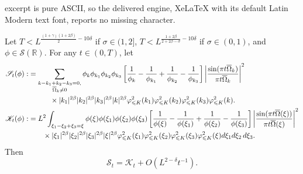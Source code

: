 \documentclass[10pt,a4paper]{amsart}
\def\dif{{\mathord{{\rm d}}}}
\def\leq{\leqslant}
\begin{document}
excerpt is pure ASCII, so the delivered engine, XeLaTeX with its default Latin Modern text font, reports no missing character.
\begin{proposition}
    \label{asymptotic}
Let $T  < L^{\frac{(1+\gamma)(1+2\beta)}{2}-10\delta}$ if $\sigma\in(1,2]$, $T  <L^{\frac{1+2\beta}{2+2\beta-\sigma}-10\delta} $ if $\sigma\in(0,1)$, and $\phi \in \mathcal{S}(\mathbb{R})$. 
For any $t \in (0,T)$, let   \begin{align*}
 \mathscr S_t(\phi):&=\sum\limits_{\substack{ k-k_1+k_2-k_3=0,\\ \overline \Omega_k\neq0}}\phi_k \phi_{k_1} \phi_{k_2} \phi_{k_3}  \left[ \frac{1}{\phi_k} - \frac{1}{\phi_{k_1}} + \frac{1}{\phi_{k_2}} - \frac{1}{\phi_{k_3}} \right]\left| \frac{\sin(\pi t\overline \Omega_k)}{\pi t \overline \Omega_k} \right|^2\notag\\
  &\quad\quad\quad\times
|k_1|^{2\beta}|k_2|^{2\beta}|k_3|^{2\beta}|k|^{2\beta}\varphi_{\leq K}^2(k_1)\varphi_{\leq K}^2(k_2)\varphi_{\leq K}^2(k_3)\varphi_{\leq K}^2(k).\\
\mathscr K_t(\phi):&=L^{2} \int_{\xi_1-\xi_2+\xi_3=\xi }\phi(\xi) \phi(\xi_1) \phi(\xi_2) \phi(\xi_3)  \left[ \frac{1}{\phi(\xi)} - \frac{1}{\phi(\xi_1)} + \frac{1}{\phi(\xi_2)} - \frac{1}{\phi(\xi_3)} \right]    \left| \frac{\sin(\pi t\overline \Omega( \xi))}{\pi t\overline\Omega( \xi)} \right|^2 \notag\\ &\quad\quad\times |\xi_1|^{2\beta}|\xi_2|^{2\beta}|\xi_3|^{2\beta}|\xi|^{2\beta}\varphi_{\leq K}^2(\xi_1)\varphi_{\leq K}^2(\xi_2)\varphi_{\leq K}^2(\xi_3)\varphi_{\leq K}^2(\xi)   \dif \xi_1  \dif\xi_2 \, \dif\xi_3.
\end{align*}
 Then
$$
\mathscr S_t=\mathscr K_t +O(L^{2-\delta} t^{-1}).
$$
\end{proposition}
\end{document}
